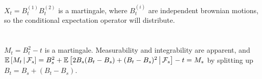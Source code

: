 \documentclass{article}
\begin{document}
\subsubsection{}
\(X_t=B_t^{(1)}B_t^{(2)}\) is a martingale, where \(B_t^{(i)}\) are independent brownian motions, so the conditional expectation operator will distribute.

\section{}

\(M_t=B_t^2-t\) is a martingale. Measurability and integrability are apparent, and \(\operatorname{\mathbb{E}}\left[ M_t \,\middle|\, \mathcal{F}_s \right]=B_s^2+\operatorname{\mathbb{E}}\left[ 2B_s(B_t-B_s)+(B_t-B_s)^2 \,\middle|\, \mathcal{F}_s \right]-t=M_s\) by splitting up \(B_t=B_s+(B_t-B_s)\).

\section{}
\end{document}
